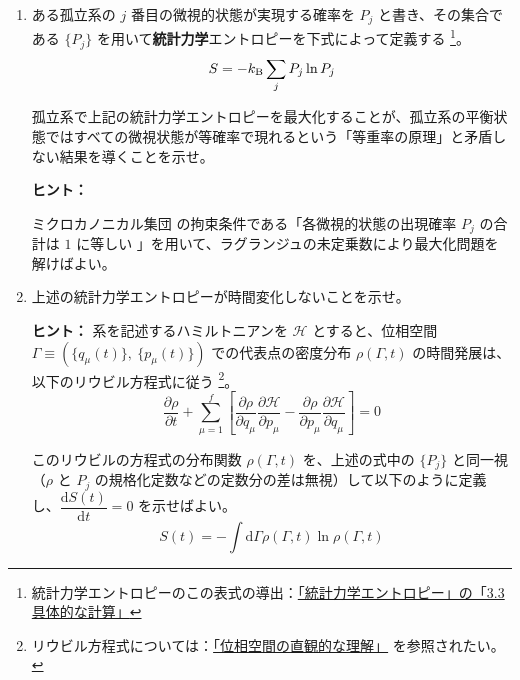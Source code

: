 \documentclass[uplatex,dvipdfmx,a4paper,11pt]{jsarticle}
\newcommand{\diff}{\mathrm d}
\newcommand{\difd}[2]{\dfrac{\diff #1}{\diff #2}}
\newcommand{\difp}[2]{\dfrac{\partial #1}{\partial #2}}
\begin{document}
\begin{enumerate}
\setlength{\parskip}{0cm} %
\setlength{\itemsep}{0.3cm} %

\item
ある孤立系の $j$ 番目の微視的状態が実現する確率を $P_j$ と書き、その集合である $\{ P_j \}$ を用いて{\bf 統計力学}エントロピーを下式によって定義する
\footnote{
統計力学エントロピーのこの表式の導出：\href{http://kisokouza.island.ac/documents/Stat_Phys_Entropy.pdf}{「統計力学エントロピー」の「3.3 具体的な計算」}
}。
\begin{equation*}
  S = -k_{\rm B} \sum_j P_j \ln P_j
  \label{eq: SM_S}
\end{equation*}

孤立系で上記の統計力学エントロピーを最大化することが、孤立系の平衡状態ではすべての微視状態が等確率で現れるという「等重率の原理」と矛盾しない結果を導くことを示せ。


\begin{itembox}[l]{{\bf ヒント：}}

ミクロカノニカル集団%
の拘束条件である「各微視的状態の出現確率 $P_j$ の合計は $1$ に等しい 」を用いて、ラグランジュの未定乗数により最大化問題を解けばよい。

\end{itembox}

\color{black}

\item
上述の統計力学エントロピーが時間変化しないことを示せ。

\begin{itembox}[l]{{\bf ヒント：}}
系を記述するハミルトニアンを $\mathcal{H}$ とすると、位相空間 $\Gamma \equiv ( \{ q_{\mu}(t) \},~ \{ p_{\mu}(t) \} )$ での代表点の密度分布 $\rho(\Gamma,t)$ の時間発展は、以下のリウビル方程式に従う
\footnote
{
リウビル方程式については：\href{http://kisokouza.island.ac/documents/Stat_Phys_Entropy.pdf}{「位相空間の直観的な理解」} を参照されたい。
}。
\begin{equation*}
\frac{\partial \rho}{\partial t} 
+ \sum_{\mu = 1}^{f} 
\left[
\difp{\rho}{q_{\mu}}
\difp{\mathcal{H}}{p_{\mu}}
- \difp{\rho}{p_{\mu}}
\difp{\mathcal{H}}{q_{\mu}}
\right]
= 0
\end{equation*}

このリウビルの方程式の分布関数 $\rho(\Gamma, t)$ を、上述の式中の $\{ P_j \}$ と同一視（$\rho$ と $P_j$ の規格化定数などの定数分の差は無視）して以下のように定義し、$\difd{S(t)}{t} = 0$ を示せばよい。
\begin{equation*}
	S(t) = - \int \diff \Gamma \rho(\Gamma,t) \ln \rho(\Gamma, t)
\end{equation*}

\end{itembox}

\color{black}

\end{enumerate}
\end{document}
